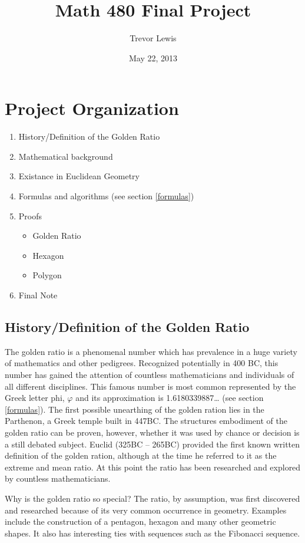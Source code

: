 \documentclass{article}
\title {Math 480 Final Project}
\author {Trevor Lewis}
\date {May 22, 2013}
\begin{document}
\maketitle

\section{Project Organization}
\begin{enumerate}
    \item{History/Definition of the Golden Ratio}
    \item{Mathematical background}
    \item{Existance in Euclidean Geometry}
    \item{Formulas and algorithms (see section \ref{formulas})}
    \item{Proofs}
    \begin{itemize}
        \item{Golden Ratio}
        \item{Hexagon}
        \item{Polygon}
    \end{itemize}
    \item{Final Note}
\end{enumerate}

\subsection{History/Definition of the Golden Ratio}

The golden ratio is a phenomenal number which has prevalence in a huge variety of mathematics and other pedigrees. Recognized potentially in 400 BC, this number has gained the attention of countless mathematicians and individuals of all different disciplines. This famous number is most common represented by the Greek letter phi, $\varphi$ and its approximation is 1.6180339887… (see section \ref{formulas}). The first possible unearthing of the golden ration lies in the Parthenon, a Greek temple built in 447BC. The structures embodiment of the golden ratio can be proven, however, whether it was used by chance or decision is a still debated subject. Euclid (325BC – 265BC) provided the first known written definition of the golden ration, although at the time he referred to it as the extreme and mean ratio. At this point the ratio has been researched and explored by countless mathematicians.

Why is the golden ratio so special? The ratio, by assumption, was first discovered and researched because of its very common occurrence in geometry. Examples include the construction of a pentagon, hexagon and many other geometric shapes. It also has interesting ties with sequences such as the Fibonacci sequence.
\end{document}

